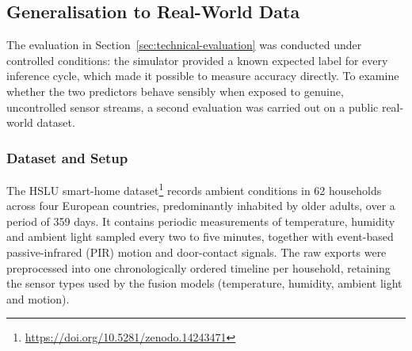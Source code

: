 %
%

\subsection{Generalisation to Real-World Data}
\label{sec:hslu-evaluation}

The evaluation in Section~\ref{sec:technical-evaluation} was conducted under
controlled conditions: the simulator provided a known expected label for every
inference cycle, which made it possible to measure accuracy directly. To examine
whether the two predictors behave sensibly when exposed to genuine, uncontrolled
sensor streams, a second evaluation was carried out on a public real-world
dataset.

\subsubsection{Dataset and Setup}

The HSLU smart-home dataset\footnote{\url{https://doi.org/10.5281/zenodo.14243471}}
records ambient conditions in 62 households across four European countries,
predominantly inhabited by older adults, over a period of 359 days. It contains
periodic measurements of temperature, humidity and ambient light sampled every
two to five minutes, together with event-based passive-infrared (PIR) motion and
door-contact signals. The raw exports were preprocessed into one chronologically
ordered timeline per household, retaining the sensor types used by the fusion
models (temperature, humidity, ambient light and motion).

